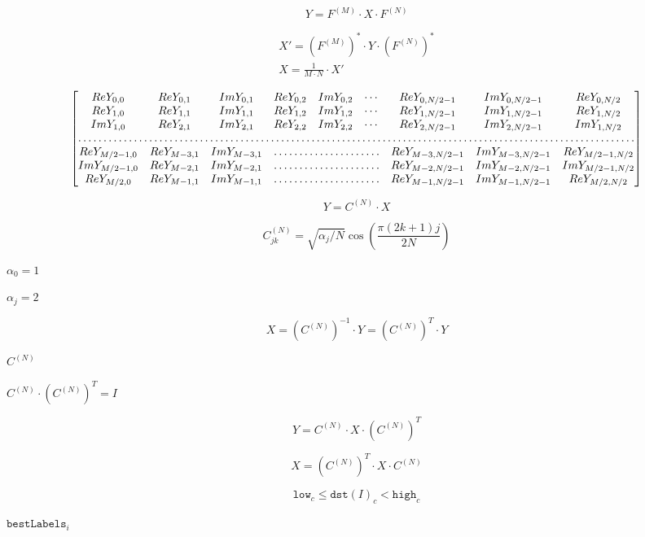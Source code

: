\documentclass{article}
\begin{document}
\[Y = F^{(M)}  \cdot X  \cdot F^{(N)}\]
\pagebreak

\[\begin{array}{l} X'=  \left (F^{(M)} \right )^*  \cdot Y  \cdot \left (F^{(N)} \right )^* \\ X =  \frac{1}{M \cdot N} \cdot X' \end{array}\]
\pagebreak

\[\begin{bmatrix} Re Y_{0,0} & Re Y_{0,1} & Im Y_{0,1} & Re Y_{0,2} & Im Y_{0,2} &  \cdots & Re Y_{0,N/2-1} & Im Y_{0,N/2-1} & Re Y_{0,N/2}  \\ Re Y_{1,0} & Re Y_{1,1} & Im Y_{1,1} & Re Y_{1,2} & Im Y_{1,2} &  \cdots & Re Y_{1,N/2-1} & Im Y_{1,N/2-1} & Re Y_{1,N/2}  \\ Im Y_{1,0} & Re Y_{2,1} & Im Y_{2,1} & Re Y_{2,2} & Im Y_{2,2} &  \cdots & Re Y_{2,N/2-1} & Im Y_{2,N/2-1} & Im Y_{1,N/2}  \\ \hdotsfor{9} \\ Re Y_{M/2-1,0} &  Re Y_{M-3,1}  & Im Y_{M-3,1} &  \hdotsfor{3} & Re Y_{M-3,N/2-1} & Im Y_{M-3,N/2-1}& Re Y_{M/2-1,N/2}  \\ Im Y_{M/2-1,0} &  Re Y_{M-2,1}  & Im Y_{M-2,1} &  \hdotsfor{3} & Re Y_{M-2,N/2-1} & Im Y_{M-2,N/2-1}& Im Y_{M/2-1,N/2}  \\ Re Y_{M/2,0}  &  Re Y_{M-1,1} &  Im Y_{M-1,1} &  \hdotsfor{3} & Re Y_{M-1,N/2-1} & Im Y_{M-1,N/2-1}& Re Y_{M/2,N/2} \end{bmatrix}\]
\pagebreak

\[Y = C^{(N)}  \cdot X\]
\pagebreak

\[C^{(N)}_{jk}= \sqrt{\alpha_j/N} \cos \left ( \frac{\pi(2k+1)j}{2N} \right )\]
\pagebreak

$\alpha_0=1$
\pagebreak

$\alpha_j=2$
\pagebreak

\[X =  \left (C^{(N)} \right )^{-1}  \cdot Y =  \left (C^{(N)} \right )^T  \cdot Y\]
\pagebreak

$C^{(N)}$
\pagebreak

$C^{(N)} \cdot \left(C^{(N)}\right)^T = I$
\pagebreak

\[Y = C^{(N)}  \cdot X  \cdot \left (C^{(N)} \right )^T\]
\pagebreak

\[X =  \left (C^{(N)} \right )^T  \cdot X  \cdot C^{(N)}\]
\pagebreak

\[\texttt{low} _c  \leq \texttt{dst} (I)_c <  \texttt{high} _c\]
\pagebreak

$\texttt{bestLabels}_i$
\pagebreak
\end{document}
